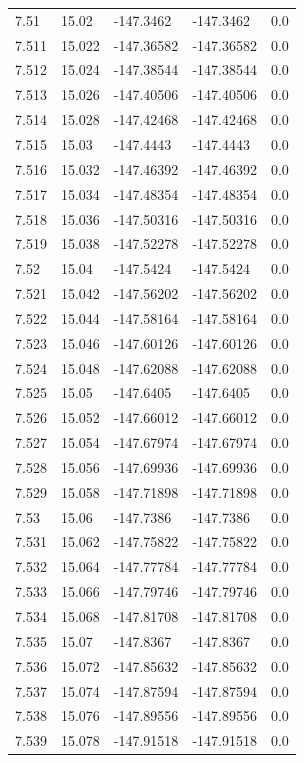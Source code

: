 \begin{tabular}{lllll}
7.51 & 15.02 & -147.3462 & -147.3462 & 0.0 \\
7.511 & 15.022 & -147.36582 & -147.36582 & 0.0 \\
7.512 & 15.024 & -147.38544 & -147.38544 & 0.0 \\
7.513 & 15.026 & -147.40506 & -147.40506 & 0.0 \\
7.514 & 15.028 & -147.42468 & -147.42468 & 0.0 \\
7.515 & 15.03 & -147.4443 & -147.4443 & 0.0 \\
7.516 & 15.032 & -147.46392 & -147.46392 & 0.0 \\
7.517 & 15.034 & -147.48354 & -147.48354 & 0.0 \\
7.518 & 15.036 & -147.50316 & -147.50316 & 0.0 \\
7.519 & 15.038 & -147.52278 & -147.52278 & 0.0 \\
7.52 & 15.04 & -147.5424 & -147.5424 & 0.0 \\
7.521 & 15.042 & -147.56202 & -147.56202 & 0.0 \\
7.522 & 15.044 & -147.58164 & -147.58164 & 0.0 \\
7.523 & 15.046 & -147.60126 & -147.60126 & 0.0 \\
7.524 & 15.048 & -147.62088 & -147.62088 & 0.0 \\
7.525 & 15.05 & -147.6405 & -147.6405 & 0.0 \\
7.526 & 15.052 & -147.66012 & -147.66012 & 0.0 \\
7.527 & 15.054 & -147.67974 & -147.67974 & 0.0 \\
7.528 & 15.056 & -147.69936 & -147.69936 & 0.0 \\
7.529 & 15.058 & -147.71898 & -147.71898 & 0.0 \\
7.53 & 15.06 & -147.7386 & -147.7386 & 0.0 \\
7.531 & 15.062 & -147.75822 & -147.75822 & 0.0 \\
7.532 & 15.064 & -147.77784 & -147.77784 & 0.0 \\
7.533 & 15.066 & -147.79746 & -147.79746 & 0.0 \\
7.534 & 15.068 & -147.81708 & -147.81708 & 0.0 \\
7.535 & 15.07 & -147.8367 & -147.8367 & 0.0 \\
7.536 & 15.072 & -147.85632 & -147.85632 & 0.0 \\
7.537 & 15.074 & -147.87594 & -147.87594 & 0.0 \\
7.538 & 15.076 & -147.89556 & -147.89556 & 0.0 \\
7.539 & 15.078 & -147.91518 & -147.91518 & 0.0 \\

\end{tabular}
